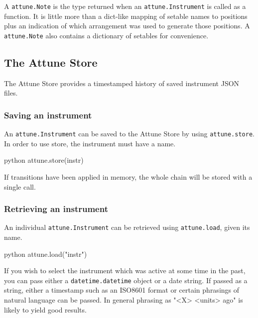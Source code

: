 A \texttt{attune.Note} is the type returned when an
\texttt{attune.Instrument} is called as a function. It
is little more than a dict-like mapping of setable names to positions
plus an indication of which arrangement was used to generate those
positions. A \texttt{attune.Note} also contains a
dictionary of setables for convenience.

\hypertarget{store}{%
\subsection{The Attune Store}\label{store}}

The Attune Store provides a timestamped history of saved instrument JSON
files.

\hypertarget{saving-an-instrument}{%
\subsubsection{Saving an instrument}\label{saving-an-instrument}}

An \texttt{attune.Instrument} can be saved to the
Attune Store by using \texttt{attune.store}. In order to use store, the
instrument must have a name.

\begin{codefragment}{python}
attune.store(instr)
\end{codefragment}

If transitions have been applied in memory, the whole chain will be
stored with a single call.

\hypertarget{retrieving-an-instrument}{%
\subsubsection{Retrieving an instrument}\label{retrieving-an-instrument}}

An individual \texttt{attune.Instrument} can be
retrieved using \texttt{attune.load}, given its name.

\begin{codefragment}{python}
attune.load("instr")
\end{codefragment}

If you wish to select the instrument which was active at some time in
the past, you can pass either a
\texttt{datetime.datetime} object or a date string. If
passed as a string, either a timestamp such as an ISO8601 format or
certain phrasings of natural language can be passed. In general phrasing
as "\textless X\textgreater{} \textless units\textgreater{} ago" is
likely to yield good results.

